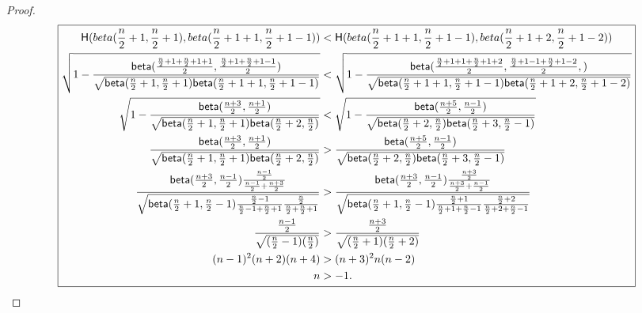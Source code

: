 \documentclass{article}
\begin{document}
\begin{proof}
\begin{equation*}
\boxed{
\begin{split}
\mathsf{H}(
beta(\frac{n}{2} + 1, \frac{n}{2} + 1), 
beta(\frac{n}{2} + 1 + 1, \frac{n}{2} + 1 - 1))
& <  \mathsf{H}(
beta(\frac{n}{2} + 1 + 1, \frac{n}{2} + 1 - 1), 
beta(\frac{n}{2} + 1 + 2, \frac{n}{2} + 1 - 2))\\
\sqrt{1 - \frac{\mathsf{beta}(
\frac{\frac{n}{2} + 1 + \frac{n}{2} + 1 + 1}{2},
\frac{\frac{n}{2} + 1 + \frac{n}{2} + 1 - 1}{2})}
{\sqrt{
\mathsf{beta}(\frac{n}{2} + 1, \frac{n}{2} + 1)
\mathsf{beta}(\frac{n}{2} + 1 + 1, \frac{n}{2} + 1 - 1)
}
}
}
& < \sqrt{1 - \frac{\mathsf{beta}(
\frac{\frac{n}{2} + 1 + 1 + \frac{n}{2} + 1 + 2}{2}, 
\frac{\frac{n}{2} + 1 - 1 + \frac{n}{2} + 1 - 2}{2}, )}
{\sqrt{
\mathsf{beta}(\frac{n}{2} + 1 + 1, \frac{n}{2} + 1 - 1)
\mathsf{beta}(\frac{n}{2} + 1 + 2, \frac{n}{2} + 1 - 2)
}
}
}\\
\sqrt{1 - \frac{\mathsf{beta}(\frac{n + 3}{2},\frac{n + 1}{2})}
{\sqrt{
\mathsf{beta}(\frac{n}{2} + 1, \frac{n}{2} + 1)
\mathsf{beta}(\frac{n}{2} + 2, \frac{n}{2})
}
}
}
& < \sqrt{1 - \frac{\mathsf{beta}(\frac{n + 5}{2}, \frac{n - 1}{2})}
{\sqrt{
\mathsf{beta}(\frac{n}{2} + 2, \frac{n}{2})
\mathsf{beta}(\frac{n}{2} + 3, \frac{n}{2} - 1)
}
}
}\\
\frac{\mathsf{beta}(\frac{n + 3}{2},\frac{n + 1}{2})}
{\sqrt{
\mathsf{beta}(\frac{n}{2} + 1, \frac{n}{2} + 1)
\mathsf{beta}(\frac{n}{2} + 2, \frac{n}{2})
}
}
& > \frac{\mathsf{beta}(\frac{n + 5}{2}, \frac{n - 1}{2})}
{\sqrt{
\mathsf{beta}(\frac{n}{2} + 2, \frac{n}{2})
\mathsf{beta}(\frac{n}{2} + 3, \frac{n}{2} - 1)
}
}\\
\frac{\mathsf{beta}(\frac{n + 3}{2},\frac{n - 1}{2}) 
\frac{\frac{n - 1}{2}}{\frac{n - 1}{2} + \frac{n + 3}{2}}}
{\sqrt{
\mathsf{beta}(\frac{n}{2} + 1, \frac{n}{2} - 1) 
\frac{\frac{n}{2} - 1}{\frac{n}{2} - 1 + \frac{n}{2} + 1} 
\frac{\frac{n}{2}}{\frac{n}{2} + \frac{n}{2} + 1}}}
& > \frac{
\mathsf{beta}(\frac{n + 3}{2}, \frac{n - 1}{2}) 
\frac{\frac{n + 3}{2}}{\frac{n + 3}{2} + \frac{n - 1}{2}} }
{\sqrt{
\mathsf{beta}(\frac{n}{2} + 1, \frac{n}{2} - 1) 
\frac{\frac{n}{2} + 1}{\frac{n}{2} + 1 + \frac{n}{2} - 1}
\frac{\frac{n}{2} + 2}{\frac{n}{2} + 2 + \frac{n}{2} - 1}}}\\
\frac{\frac{n - 1}{2}}{\sqrt{(\frac{n}{2} - 1)(\frac{n}{2})}}
& > \frac{\frac{n + 3}{2}}{\sqrt{(\frac{n}{2} + 1)(\frac{n}{2} + 2)}}\\
(n - 1) ^ 2 (n + 2)(n + 4)
& > (n + 3) ^ 2 n (n - 2)\\
n & > -1.
\end{split}
}
\end{equation*}


\end{proof}
\end{document}
